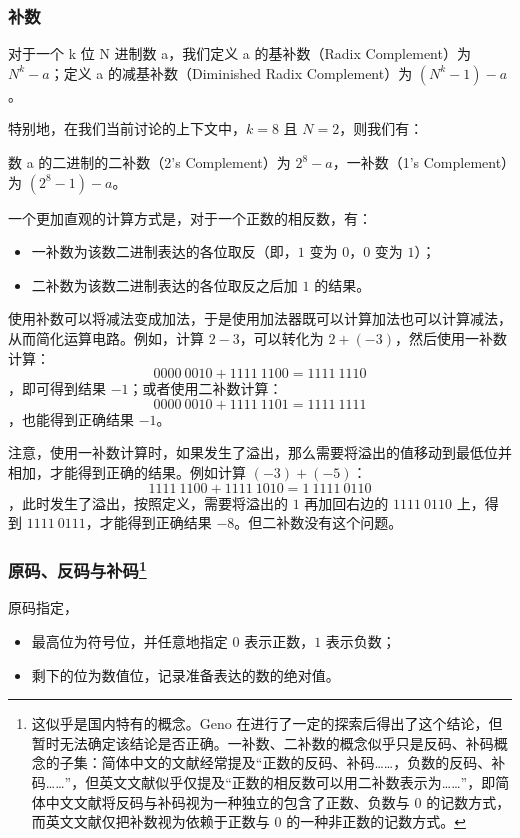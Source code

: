         \subsubsection{补数}\label{subsubsec:ArithBasics/positional-notation-presentation/binary/complement}
            对于一个 k 位 N 进制数 a，我们定义 a 的基补数（Radix Complement）为 $N ^ k - a$；定义 a 的减基补数（Diminished Radix Complement）为 $(N ^ k - 1) - a$。

            特别地，在我们当前讨论的上下文中，$k = 8$ 且 $N = 2$，则我们有：

            数 a 的二进制的二补数（2's Complement）为 $2 ^ 8 - a$，一补数（1's Complement）为 $(2 ^ 8 - 1) - a$。

            一个更加直观的计算方式是，对于一个正数的相反数，有：
            \begin{itemize}
                \item 一补数为该数二进制表达的各位取反（即，$1$ 变为 $0$，$0$ 变为 $1$）；
                \item 二补数为该数二进制表达的各位取反之后加 $1$ 的结果。
            \end{itemize}

            使用补数可以将减法变成加法，于是使用加法器既可以计算加法也可以计算减法，从而简化运算电路。例如，计算 $2 - 3$，可以转化为 $2 + (-3)$，然后使用一补数计算：
            \[0000\ 0010 + 1111\ 1100 = 1111\ 1110\]
            ，即可得到结果 $-1$；或者使用二补数计算：
            \[0000\ 0010 + 1111\ 1101 = 1111\ 1111\]
            ，也能得到正确结果 $-1$。

            注意，使用一补数计算时，如果发生了溢出，那么需要将溢出的值移动到最低位并相加，才能得到正确的结果。例如计算 $(-3) + (-5)$：
            \[1111\ 1100 + 1111\ 1010 = 1\ 1111\ 0110\]
            ，此时发生了溢出，按照定义，需要将溢出的 $1$ 再加回右边的 $1111\ 0110$ 上，得到 $1111\ 0111$，才能得到正确结果 $-8$。但二补数没有这个问题。

        \subsubsection[原码、反码与补码]{原码、反码与补码\footnote{这似乎是国内特有的概念。Geno 在进行了一定的探索后得出了这个结论，但暂时无法确定该结论是否正确。一补数、二补数的概念似乎只是反码、补码概念的子集：简体中文的文献经常提及“正数的反码、补码……，负数的反码、补码……”，但英文文献似乎仅提及“正数的相反数可以用二补数表示为……”，即简体中文文献将反码与补码视为一种独立的包含了正数、负数与 $0$ 的记数方式，而英文文献仅把补数视为依赖于正数与 $0$ 的一种非正数的记数方式。}}\label{subsubsec:ArithBasics/positional-notation-presentation/binary/chinese-only}
            原码指定，
            \begin{itemize}
                \item 最高位为符号位，并任意地指定 $0$ 表示正数，$1$ 表示负数；
                \item 剩下的位为数值位，记录准备表达的数的绝对值。
            \end{itemize}


